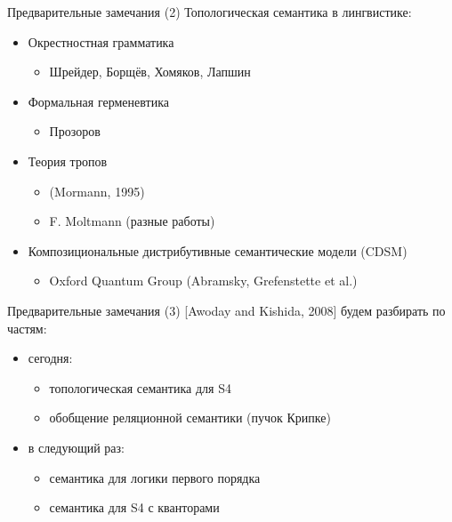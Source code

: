 \documentclass{beamer}
\begin{document}
\begin{frame}{Предварительные замечания (2)}
Топологическая семантика в лингвистике:\\
\bigskip
\begin{itemize}
    \item Окрестностная грамматика
		\begin{itemize}
			\item Шрейдер, Борщёв, Хомяков, Лапшин
		\end{itemize}
    \item Формальная герменевтика
		\begin{itemize}
			\item Прозоров
		\end{itemize}
    \item Теория тропов
		\begin{itemize}
			\item (Mormann, 1995)
			\item F. Moltmann (разные работы)
		\end{itemize}
    \item Композициональные дистрибутивные семантические модели (CDSM)
		\begin{itemize}
			\item Oxford Quantum Group (Abramsky, Grefenstette et al.)
		\end{itemize}
\end{itemize}
\end{frame}

\begin{frame}{Предварительные замечания (3)}
[Awoday and Kishida, 2008] будем разбирать по частям:\\
\bigskip
\begin{itemize}
	\item сегодня:
		\medskip
		\begin{itemize}
			\item топологическая семантика для S4
			\item обобщение реляционной семантики (пучок Крипке)
		\end{itemize}
	\bigskip
	\item в следующий раз:
		\medskip
		\begin{itemize}
			\item семантика для логики первого порядка
			\item семантика для S4 с кванторами
		\end{itemize}
\end{itemize}
\end{frame}
\end{document}
